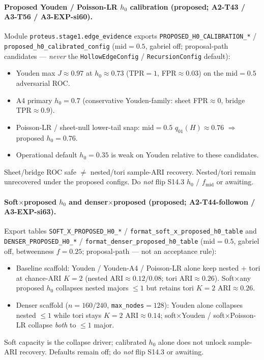 \documentclass[11pt]{article}
\begin{document}
\paragraph{Proposed Youden / Poisson-LR $h_0$ calibration (proposed; A2-T43 /
A3-T56 / A3-EXP-si60).}
Module \texttt{proteus.stage1.edge\_evidence} exports
\texttt{PROPOSED\_H0\_CALIBRATION\_*} /
\texttt{proposed\_h0\_calibrated\_config} (mid${=}0.5$, gabriel off;
proposal-path candidates --- \emph{never} the
\texttt{HollowEdgeConfig} / \texttt{RecursionConfig} default):
\begin{itemize}[leftmargin=1.5em]
  \item Youden max $J\approx 0.97$ at $h_0\approx 0.73$ (TPR${=}1$,
  FPR$\approx 0.03$) on the mid${=}0.5$ adversarial ROC.
  \item A4 primary $h_0{=}0.7$ (conservative Youden-family: sheet FPR$\approx 0$,
  bridge TPR$\approx 0.9$).
  \item Poisson-LR / sheet-null lower-tail snap: mid${=}0.5$
  $q_{01}(H)\approx 0.76$ $\Rightarrow$ proposed $h_0{=}0.76$.
  \item Operational default $h_0{=}0.35$ is weak on Youden relative to these
  candidates.
\end{itemize}
Sheet/bridge ROC safe $\neq$ nested/tori sample-ARI recovery. Nested/tori
remain unrecovered under the proposed configs. Do \emph{not} flip S14.3
$h_0$ / $f_{\mathrm{mid}}$ or awaiting.

\paragraph{Soft$\times$proposed $h_0$ and denser$\times$proposed (proposed;
A2-T44-followon / A3-EXP-si63).}
Export tables \texttt{SOFT\_X\_PROPOSED\_H0\_*} /
\texttt{format\_soft\_x\_proposed\_h0\_table} and
\texttt{DENSER\_PROPOSED\_H0\_*} /
\texttt{format\_denser\_proposed\_h0\_table} (mid${=}0.5$, gabriel off,
betweenness $f{=}0.25$; proposal-path --- not an acceptance rule):
\begin{itemize}[leftmargin=1.5em]
  \item Baseline scaffold: Youden / Youden-A4 / Poisson-LR alone keep nested
  $+$ tori at chance-ARI $K{=}2$ (nested ARI$\approx 0.12/0.08$; tori
  ARI$\approx 0.26$). Soft$\times$any proposed $h_0$ collapses nested majors
  $\le 1$ but retains tori $K{=}2$ ARI$\approx 0.26$.
  \item Denser scaffold ($n{=}160/240$, \texttt{max\_nodes}${=}128$): Youden
  alone collapses nested $\le 1$ while tori stays $K{=}2$ ARI$\approx 0.14$;
  soft$\times$Youden / soft$\times$Poisson-LR collapse \emph{both} to
  $\le 1$ major.
\end{itemize}
Soft capacity is the collapse driver; calibrated $h_0$ alone does not unlock
sample-ARI recovery. Defaults remain off; do \emph{not} flip S14.3 or awaiting.
\end{document}
